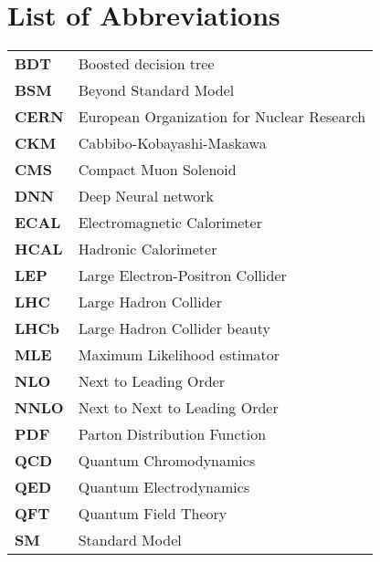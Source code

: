 
\newpage
\chapter*{List of Abbreviations}




\begin{table}[h!]
    \centering
    \begin{tabular}{l l} 

        \textbf{BDT} & Boosted decision tree \\ [0.5ex] 
        \textbf{BSM} & Beyond Standard Model \\ [0.5ex] 
        \textbf{CERN} & European Organization for Nuclear Research \\ [0.5ex] 
        \textbf{CKM} & Cabbibo-Kobayashi-Maskawa \\ [0.5ex] 
        \textbf{CMS} & Compact Muon Solenoid \\ [0.5ex] 
        \textbf{DNN} & Deep Neural network \\ [0.5ex] 
        \textbf{ECAL} & Electromagnetic Calorimeter \\ [0.5ex] 
        \textbf{HCAL} & Hadronic Calorimeter \\ [0.5ex] 
        \textbf{LEP} & Large Electron-Positron Collider \\ [0.5ex] 
        \textbf{LHC} & Large Hadron Collider \\ [0.5ex] 
        \textbf{LHCb} & Large Hadron Collider beauty \\ [0.5ex]
        \textbf{MLE} & Maximum Likelihood estimator \\ [0.5ex]
        \textbf{NLO} & Next to Leading Order \\ [0.5ex] 
        \textbf{NNLO} & Next to Next to Leading Order \\ [0.5ex] 
        \textbf{PDF} & Parton Distribution Function \\ [0.5ex] 
        \textbf{QCD} & Quantum Chromodynamics \\ [0.5ex] 
        \textbf{QED} & Quantum Electrodynamics \\ [0.5ex] 
        \textbf{QFT} & Quantum Field Theory \\ [0.5ex] 
        \textbf{SM} & Standard Model \\ [0.5ex] 
        
     
     
     
      

     
      
     


    \end{tabular}
    \end{table}
